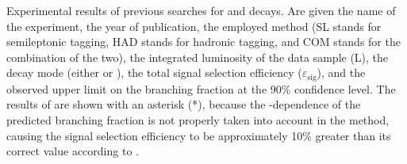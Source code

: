 {Experimental results of previous searches for \BKpnn and \BKzznn decays.
Are given the name of the experiment, the year of publication, the employed method (SL stands for semileptonic tagging, HAD stands for hadronic tagging, and COM stands for the combination of the two), the integrated luminosity of the data sample (L), the decay mode (either \Kp or \Kz), the total signal selection efficiency ($\varepsilon_{\mathrm{sig}}$), and the observed upper limit on the branching fraction at the 90\% confidence level.
The results of \autocite{BaBar:2010oqg} are shown with an asterisk (*), because the \qq-dependence of the predicted branching fraction is not properly taken into account in the method, causing the signal selection efficiency to be approximately 10\% greater than its correct value according to \autocite{BaBar:2013npw}.}

